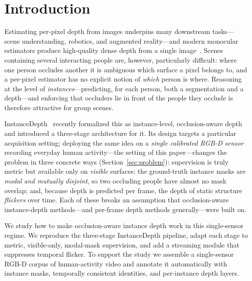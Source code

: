 \documentclass[sigconf, review=true]{acmart}
\begin{document}

\maketitle


\section{Introduction}
\label{sec:intro}
Estimating per-pixel depth from images underpins many downstream tasks---scene
understanding, robotics, and augmented reality---and modern monocular estimators
produce high-quality dense depth from a single
image~\cite{ranftl2021dpt,yang2024depthanythingv2}. Scenes containing several
interacting people are, however, particularly difficult: where one person
occludes another it is ambiguous which surface a pixel belongs to, and a
per-pixel estimator has no explicit notion of \emph{which} person is where.
Reasoning at the level of \emph{instances}---predicting, for each person, both a
segmentation and a depth---and enforcing that occluders lie in front of the
people they occlude is therefore attractive for group scenes.

InstanceDepth~\cite{liang2025instancedepth} recently formalized this as
instance-level, occlusion-aware depth and introduced a three-stage architecture
for it. Its design targets a particular acquisition setting; deploying the same
idea on a \emph{single calibrated RGB-D sensor} recording everyday human
activity---the setting of this paper---changes the problem in three concrete
ways (Section~\ref{sec:problem}): supervision is truly metric but available only
on \emph{visible} surfaces; the ground-truth instance masks are \emph{modal and
mutually disjoint}, so two occluding people have almost no mask overlap; and,
because depth is predicted per frame, the depth of static structure
\emph{flickers} over time. Each of these breaks an assumption that
occlusion-aware instance-depth methods---and per-frame depth methods
generally---were built on.

We study how to make occlusion-aware instance depth work in this single-sensor
regime. We reproduce the three-stage InstanceDepth pipeline, adapt each stage to
metric, visible-only, modal-mask supervision, and add a streaming module that
suppresses temporal flicker. To support the study we assemble a single-sensor
RGB-D corpus of human-activity video and annotate it automatically with instance
masks, temporally consistent identities, and per-instance depth layers.
\end{document}
